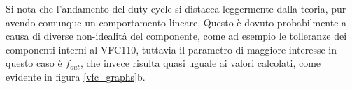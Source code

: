 Si nota che l'andamento del duty cycle si distacca leggermente dalla teoria, pur avendo
comunque un comportamento lineare. Questo è dovuto probabilmente a causa di diverse
non-idealità del componente, come ad esempio le tolleranze dei componenti interni al
VFC110, tuttavia il parametro di maggiore interesse in questo caso è $f_{out}$, che invece
risulta quasi uguale ai valori calcolati, come evidente in figura \ref{vfc_graphs}b.

